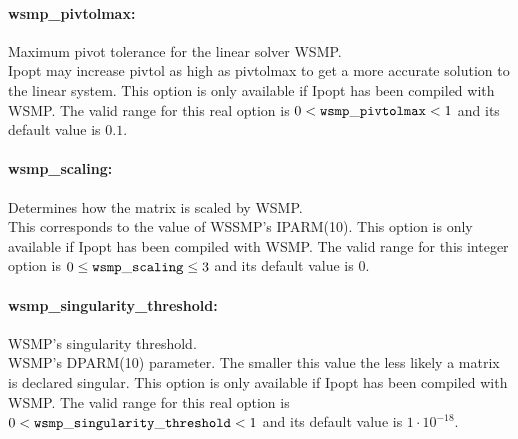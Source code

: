 \paragraph{wsmp\_pivtolmax:}\label{opt:wsmp_pivtolmax} Maximum pivot tolerance for the linear solver WSMP.  \\
 Ipopt may increase pivtol as high as pivtolmax to
get a more accurate solution to the linear
system.  This option is only available if Ipopt
has been compiled with WSMP. The valid range for this real option is 
$0 <  {\tt wsmp\_pivtolmax } <  1$
and its default value is $0.1$.


\paragraph{wsmp\_scaling:}\label{opt:wsmp_scaling} Determines how the matrix is scaled by WSMP.  \\
 This corresponds to the value of WSSMP's
IPARM(10). This option is only available if Ipopt
has been compiled with WSMP. The valid range for this integer option is
$0 \le {\tt wsmp\_scaling } \le 3$
and its default value is $0$.


\paragraph{wsmp\_singularity\_threshold:}\label{opt:wsmp_singularity_threshold} WSMP's singularity threshold.  \\
 WSMP's DPARM(10) parameter.  The smaller this
value the less likely a matrix is declared
singular.  This option is only available if Ipopt
has been compiled with WSMP. The valid range for this real option is 
$0 <  {\tt wsmp\_singularity\_threshold } <  1$
and its default value is $1 \cdot 10^{-18}$.
